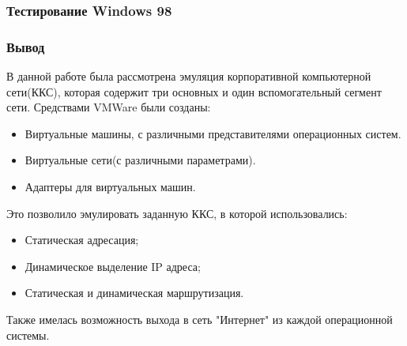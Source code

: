 \documentclass[9pt, compress]{beamer}
\begin{document}
\begin{frame}[fragile]
\frametitle{Тестирование Windows 98}
\begin{center}  
\end{center}
\end{frame}

\begin{frame}[fragile]
\frametitle{Вывод}
В данной работе была рассмотрена эмуляция корпоративной компьютерной сети(ККС), которая содержит три основных и один вспомогательный сегмент сети. Средствами VMWare были созданы:
\begin{itemize}
\item Виртуальные машины, с различными представителями операционных систем.
\item Виртуальные сети(с различными параметрами).
\item Адаптеры для виртуальных машин.
\end{itemize}
Это позволило эмулировать заданную ККС, в которой использовались:
\begin{itemize}
\item Статическая адресация;
\item Динамическое выделение IP адреса;
\item Статическая и динамическая маршрутизация.
\end{itemize}
Также имелась возможность выхода в сеть "Интернет" из каждой операционной системы.
\end{frame}	
	

	
\end{document}
